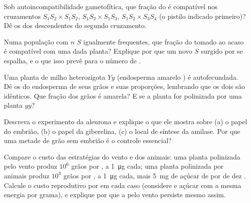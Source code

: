\begin{exercise}[$\star\star$]\label{exo:b2:angiosperm-reproduction:6}
Sob autoincompatibilidade gametofítica, que fração do  é
compatível nos cruzamentos $S_1S_2\times S_1S_2$, $S_1S_2\times
S_1S_3$, $S_1S_2\times S_3S_4$ (o pistilo indicado primeiro)? Dê os
 dos descendentes do segundo cruzamento.
\end{exercise}

\begin{exercise}[$\star\star$]\label{exo:b2:angiosperm-reproduction:7}
Numa população com $n$  $S$ igualmente frequentes, que fração do
 tomado ao acaso é compatível com uma dada planta? Explique por
que um novo  $S$ surgido por  se espalha, e o que isso
prevê para o número de .
\end{exercise}

\begin{exercise}[$\star\star$]\label{exo:b2:angiosperm-reproduction:8}
Uma planta de milho heterozigota $Yy$ (endosperma amarelo ) é
autofecundada. Dê os  do endosperma de seus grãos e suas
proporções, lembrando que os dois  são idênticos. Que
fração dos grãos é amarela? E se a planta for polinizada por uma planta
$yy$?
\end{exercise}

\begin{exercise}[$\star\star$]\label{exo:b2:angiosperm-reproduction:9}
Descreva o experimento da aleurona e explique o que ele mostra sobre
(a) o papel do embrião, (b) o papel da giberelina, (c) o local de
síntese da amilase. Por que uma metade de grão sem embrião é o controle
essencial?
\end{exercise}

\begin{exercise}[$\star\star\star$]\label{exo:b2:angiosperm-reproduction:10}
Compare o custo das estratégias do vento e dos animais: uma planta
polinizada pelo vento produz $10^{6}$ grãos por , a
\qty{1}{\micro g} cada; uma planta polinizada por animais produz
$10^{3}$ grãos por , a \qty{1}{\micro g} cada, mais \qty{5}{mg}
de açúcar de  por  de dez . Calcule o custo reprodutivo
por  em cada caso (considere  e açúcar com a mesma energia
por grama), e explique por que a  pelo vento persiste mesmo
assim.
\end{exercise}

